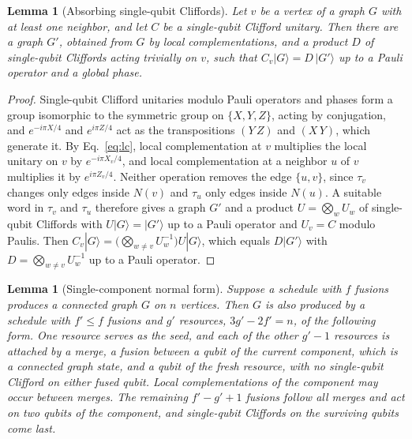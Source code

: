 \documentclass[aps,pra,onecolumn,superscriptaddress,nofootinbib,longbibliography]{revtex4-2}
\theoremstyle{plain}
\newtheorem{lemma}[theorem]{Lemma}
\theoremstyle{remark}
\newcommand{\nbr}{N}
\begin{document}
\begin{lemma}[Absorbing single-qubit Cliffords]\label{lem:frame}
Let $v$ be a vertex of a graph $G$ with at least one neighbor, and let $C$ be a single-qubit Clifford
unitary. Then there are a graph $G'$, obtained from $G$ by local complementations, and a product $D$ of
single-qubit Cliffords acting trivially on $v$, such that $C_v|G\rangle=D\,|G'\rangle$ up to a Pauli
operator and a global phase.
\end{lemma}

\begin{proof}
Single-qubit Clifford unitaries modulo Pauli operators and phases form a group isomorphic to the symmetric
group on $\{X,Y,Z\}$, acting by conjugation, and $e^{-i\pi X/4}$ and $e^{i\pi Z/4}$ act as the transpositions
$(Y\,Z)$ and $(X\,Y)$, which generate it. By Eq.~\eqref{eq:lc}, local complementation at $v$ multiplies the
local unitary on $v$ by $e^{-i\pi X_v/4}$, and local complementation at a neighbor $u$ of $v$ multiplies it
by $e^{i\pi Z_v/4}$. Neither operation removes the edge $\{u,v\}$, since $\tau_v$ changes only edges inside
$\nbr(v)$ and $\tau_u$ only edges inside $\nbr(u)$. A suitable word in $\tau_v$ and $\tau_u$ therefore gives
a graph $G'$ and a product $U=\bigotimes_w U_w$ of single-qubit Cliffords with $U|G\rangle=|G'\rangle$ up to a
Pauli operator and $U_v=C$ modulo Paulis. Then $C_v|G\rangle=\big(\bigotimes_{w\neq v}U_w^{-1}\big)U|G\rangle$,
which equals $D|G'\rangle$ with $D=\bigotimes_{w\ne v}U_w^{-1}$ up to a Pauli operator.
\end{proof}

\begin{lemma}[Single-component normal form]\label{lem:normal}
Suppose a schedule with $f$ fusions produces a connected graph $G$ on $n$ vertices. Then $G$ is also
produced by a schedule with $f'\le f$ fusions and $g'$ resources, $3g'-2f'=n$, of the following form. One
resource serves as the seed, and each of the other $g'-1$ resources is attached by a merge, a fusion between
a qubit of the current component, which is a connected graph state, and a qubit of the fresh resource, with
no single-qubit Clifford on either fused qubit. Local complementations of the component may occur between
merges. The remaining $f'-g'+1$ fusions follow all merges and act on two qubits of the component, and
single-qubit Cliffords on the surviving qubits come last.
\end{lemma}
\end{document}
